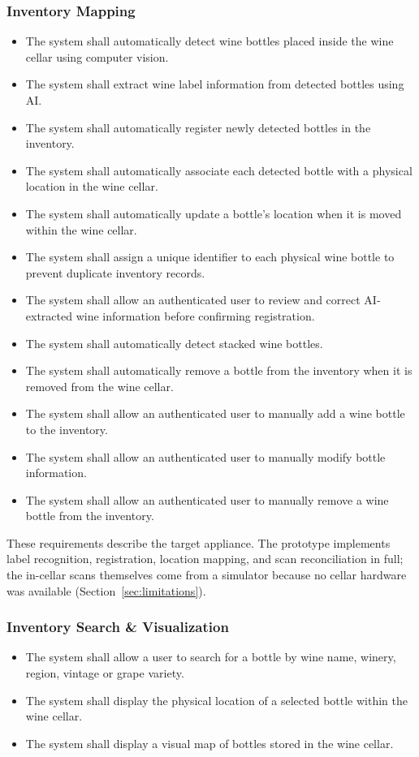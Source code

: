 \documentclass[conference]{IEEEtran}
\begin{document}
\subsubsection{Inventory Mapping}
\begin{itemize}
    \item The system shall automatically detect wine bottles placed inside the wine cellar using computer vision.
    \item The system shall extract wine label information from detected bottles using AI.
    \item The system shall automatically register newly detected bottles in the inventory.
    \item The system shall automatically associate each detected bottle with a physical location in the wine cellar.
    \item The system shall automatically update a bottle's location when it is moved within the wine cellar.
    \item The system shall assign a unique identifier to each physical wine bottle to prevent duplicate inventory records.
    \item The system shall allow an authenticated user to review and correct AI-extracted wine information before confirming registration.
    \item The system shall automatically detect stacked wine bottles.
    \item The system shall automatically remove a bottle from the inventory when it is removed from the wine cellar.
    \item The system shall allow an authenticated user to manually add a wine bottle to the inventory.
    \item The system shall allow an authenticated user to manually modify bottle information.
    \item The system shall allow an authenticated user to manually remove a wine bottle from the inventory.
\end{itemize}
These requirements describe the target appliance. The prototype implements label recognition, registration, location mapping, and scan reconciliation in full; the in-cellar scans themselves come from a simulator because no cellar hardware was available (Section~\ref{sec:limitations}).

\subsubsection{Inventory Search \& Visualization}
\begin{itemize}
    \item The system shall allow a user to search for a bottle by wine name, winery, region, vintage or grape variety.
    \item The system shall display the physical location of a selected bottle within the wine cellar.
    \item The system shall display a visual map of bottles stored in the wine cellar.
\end{itemize}
\end{document}
